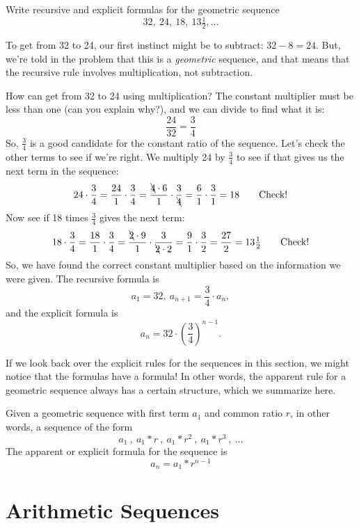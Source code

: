 \begin{boxedex}
Write recursive and explicit formulas for the geometric sequence
\[32,~ 24,~ 18,~ 13\tfrac{1}{2}, \dotsc\]

\exsoln{} To get from 32 to 24, our first instinct might be to subtract: $32 - 8 = 24$. But, we're told in the problem that this is a \textit{geometric} sequence, and that means that the recursive rule involves multiplication, not subtraction.

How can get from 32 to 24 using multiplication? The constant multiplier must be less than one (can you explain why?), and we can divide to find what it is: \[\frac{24}{32} = \frac{3}{4}\]
So, $\frac{3}{4}$ is a good candidate for the constant ratio of the sequence. Let's check the other terms to see if we're right. We multiply 24 by $\frac{3}{4}$ to see if that gives us the next term in the sequence: \[24 \cdot\frac{3}{4} = \frac{24}{1}\cdot\frac{3}{4} = \frac{\bcancel{4} \cdot 6}{1}\cdot\frac{3}{\bcancel{4}} = \frac{6}{1}\cdot\frac{3}{1} = 18 \qquad\text{Check!}\]
Now see if 18 times $\frac{3}{4}$ gives the next term:
\[18 \cdot\frac{3}{4} = \frac{18}{1}\cdot\frac{3}{4} = \frac{\bcancel{2} \cdot 9}{1}\cdot\frac{3}{\bcancel{2} \cdot 2} = \frac{9}{1}\cdot\frac{3}{2} = \frac{27}{2} = 13\tfrac{1}{2} \qquad\text{Check!}\]
So, we have found the correct constant multiplier based on the information we were given. The recursive formula is
\[a_1 = 32, ~ a_{n+1} = \frac{3}{4} \cdot a_n,\] and the explicit formula is
\[a_n = 32 \cdot \left( \frac{3}{4} \right)^{n-1}.\]
\end{boxedex}

If we look back over the explicit rules for the sequences in this section, we might notice that the formulas have a formula! In other words, the apparent rule for a geometric sequence always has a certain structure, which we summarize here.

\begin{boxeddef}
Given a geometric sequence with first term $a_1$ and common ratio $r$, in other words, a sequence of the form \[a_1~,~ a_1\ast r~,~ a_1\ast r^2~,~ a_1\ast r^3~,~ \dotsc\]
The apparent or explicit formula for the sequence is \[a_n = a_1\ast r^{n-1}\]
\end{boxeddef}


\section{Arithmetic Sequences}
\label{sec:arithmeticseq}

